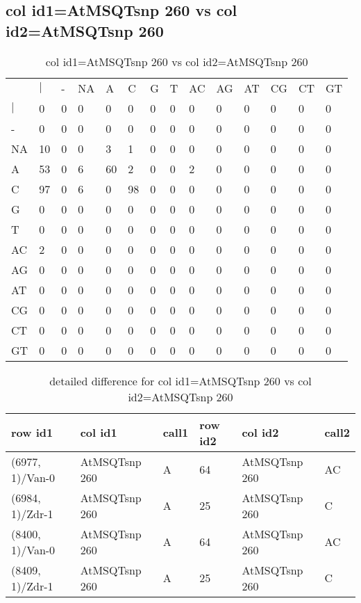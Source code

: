 \subsection{col id1=AtMSQTsnp 260 vs col id2=AtMSQTsnp 260}
\begin{center}
\begin{longtable}{|l|l|l|l|l|l|l|l|l|l|l|l|l|l|}
\caption{col id1=AtMSQTsnp 260 vs col id2=AtMSQTsnp 260} \label{table_dm800}\\
\hline
\\
\hline
&$|$&-&NA&A&C&G&T&AC&AG&AT&CG&CT&GT\\
$|$&0&0&0&0&0&0&0&0&0&0&0&0&0\\
-&0&0&0&0&0&0&0&0&0&0&0&0&0\\
NA&10&0&0&3&1&0&0&0&0&0&0&0&0\\
A&53&0&6&60&2&0&0&2&0&0&0&0&0\\
C&97&0&6&0&98&0&0&0&0&0&0&0&0\\
G&0&0&0&0&0&0&0&0&0&0&0&0&0\\
T&0&0&0&0&0&0&0&0&0&0&0&0&0\\
AC&2&0&0&0&0&0&0&0&0&0&0&0&0\\
AG&0&0&0&0&0&0&0&0&0&0&0&0&0\\
AT&0&0&0&0&0&0&0&0&0&0&0&0&0\\
CG&0&0&0&0&0&0&0&0&0&0&0&0&0\\
CT&0&0&0&0&0&0&0&0&0&0&0&0&0\\
GT&0&0&0&0&0&0&0&0&0&0&0&0&0\\
\hline
\end{longtable}
\end{center}

\begin{center}
\begin{longtable}{|l|l|l|l|l|l|}
\caption{detailed difference for col id1=AtMSQTsnp 260 vs col id2=AtMSQTsnp 260} \label{table_dm801}\\
\hline
row id1&col id1&call1&row id2&col id2&call2\\
\hline
(6977, 1)/Van-0&AtMSQTsnp 260&A&64&AtMSQTsnp 260&AC\\
(6984, 1)/Zdr-1&AtMSQTsnp 260&A&25&AtMSQTsnp 260&C\\
(8400, 1)/Van-0&AtMSQTsnp 260&A&64&AtMSQTsnp 260&AC\\
(8409, 1)/Zdr-1&AtMSQTsnp 260&A&25&AtMSQTsnp 260&C\\
\hline
\end{longtable}
\end{center}

